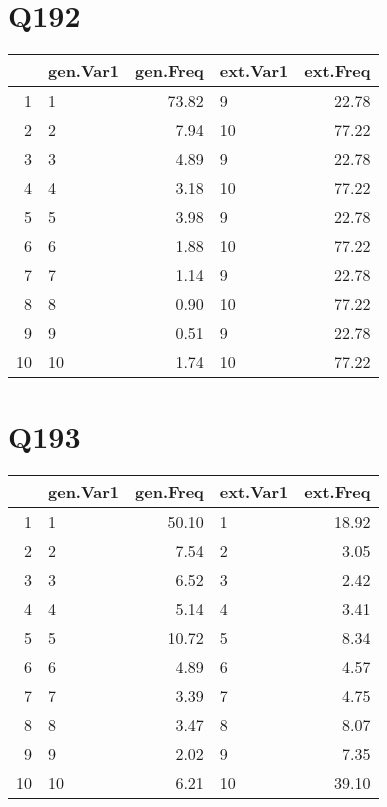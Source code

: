 \documentclass{amsart}
\begin{document}
\section{Q192}
\begin{table}[ht]
\centering
\begin{tabular}{rlrlr}
  \hline
 & gen.Var1 & gen.Freq & ext.Var1 & ext.Freq \\ 
  \hline
1 & 1 & 73.82 & 9 & 22.78 \\ 
  2 & 2 & 7.94 & 10 & 77.22 \\ 
  3 & 3 & 4.89 & 9 & 22.78 \\ 
  4 & 4 & 3.18 & 10 & 77.22 \\ 
  5 & 5 & 3.98 & 9 & 22.78 \\ 
  6 & 6 & 1.88 & 10 & 77.22 \\ 
  7 & 7 & 1.14 & 9 & 22.78 \\ 
  8 & 8 & 0.90 & 10 & 77.22 \\ 
  9 & 9 & 0.51 & 9 & 22.78 \\ 
  10 & 10 & 1.74 & 10 & 77.22 \\ 
   \hline
\end{tabular}
\end{table}

\section{Q193}
\begin{table}[ht]
\centering
\begin{tabular}{rlrlr}
  \hline
 & gen.Var1 & gen.Freq & ext.Var1 & ext.Freq \\ 
  \hline
1 & 1 & 50.10 & 1 & 18.92 \\ 
  2 & 2 & 7.54 & 2 & 3.05 \\ 
  3 & 3 & 6.52 & 3 & 2.42 \\ 
  4 & 4 & 5.14 & 4 & 3.41 \\ 
  5 & 5 & 10.72 & 5 & 8.34 \\ 
  6 & 6 & 4.89 & 6 & 4.57 \\ 
  7 & 7 & 3.39 & 7 & 4.75 \\ 
  8 & 8 & 3.47 & 8 & 8.07 \\ 
  9 & 9 & 2.02 & 9 & 7.35 \\ 
  10 & 10 & 6.21 & 10 & 39.10 \\ 
   \hline
\end{tabular}
\end{table}
\end{document}
